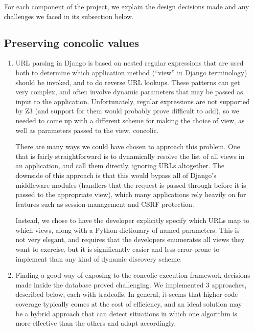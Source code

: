 \documentclass{scrartcl}
\begin{document}
For each component of the project, we explain the design decisions
made and any challenges we faced in its subsection below.

\subsection{Preserving concolic values}

\begin{enumerate}
\item URL parsing in Django is based on nested regular expressions that
  are used both to determine which application method (``view''
  in Django terminology) should be invoked, and to do reverse URL
  lookups. These patterns can get very complex, and often involve
  dynamic parameters that may be passed as input to the
  application. Unfortunately, regular expressions are not
  supported by Z3 (and support for them would probably prove
  difficult to add), so we needed to come up with a different
  scheme for making the choice of view, as well as parameters
  passed to the view, concolic.

  There are many ways we could have chosen to approach this
  problem. One that is fairly straightforward is to dynamically
  resolve the list of all views in an application, and call them
  directly, ignoring URLs altogether.  The downside of this
  approach is that this would bypass all of Django's middleware
  modules (handlers that the request is passed through before it
  is passed to the appropriate view), which many applications
  rely heavily on for features such as session management and
  CSRF protection.

  Instead, we chose to have the developer explicitly specify
  which URLs map to which views, along with a Python dictionary
  of named parameters. This is not very elegant, and requires
  that the developers enumerates all views they want to exercise,
  but it is significantly easier and less error-prone to
  implement than any kind of dynamic discovery scheme.

\item Finding a good way of exposing to the concolic execution framework
  decisions made inside the database proved challenging. We implemented 3
  approaches, described below, each with tradeoffs. In general, it seems
  that higher code coverage typically comes at the cost of efficiency, and an
  ideal solution may be a hybrid approach that can detect situations in which
  one algorithm is more effective than the others and adapt accordingly.


\end{enumerate}
\end{document}
